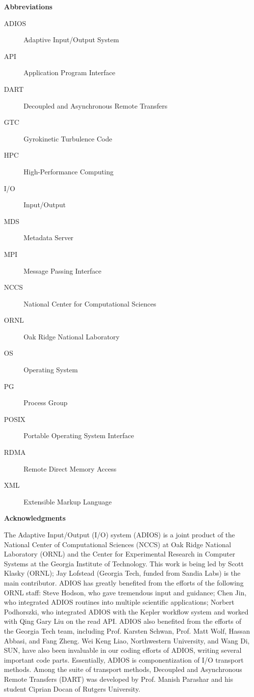 \vspace{66pt}
\textbf{Abbreviations}

\begin{description}
\item[ADIOS]  Adaptive Input/Output System
\item[API] Application Program Interface
\item[DART] Decoupled and Asynchronous Remote Transfers
\item[GTC] Gyrokinetic Turbulence Code
\item[HPC] High-Performance Computing
\item[I/O] Input/Output
\item[MDS] Metadata Server
\item[MPI] Message Passing Interface
\item[NCCS] National Center for Computational Sciences
\item[ORNL] Oak Ridge National Laboratory
\item[OS] Operating System
\item[PG] Process Group
\item[POSIX] Portable Operating System Interface
\item[RDMA] Remote Direct Memory Access
\item[XML] Extensible Markup Language
\end{description}


\vspace{18pt}
\begin{center}
{\large \textbf{Acknowledgments}}
\end{center}

\vspace{6pt}
The Adaptive Input/Output (I/O) system (ADIOS) is a joint product of the National 
Center of Computational Sciences (NCCS) at Oak Ridge National Laboratory (ORNL) 
and the Center for Experimental Research in Computer Systems at the Georgia Institute 
of Technology. This work is being led by Scott Klasky (ORNL); Jay Lofstead (Georgia 
Tech, funded from Sandia Labs) is the main contributor. ADIOS has greatly benefited 
from the efforts of the following ORNL staff: Steve Hodson, who gave tremendous 
input and guidance; Chen Jin, who integrated ADIOS routines into multiple scientific 
applications; Norbert Podhorszki, who integrated ADIOS with the Kepler workflow 
system and worked with Qing Gary Liu on the read API. ADIOS also benefited from 
the efforts of the Georgia Tech team, including Prof. Karsten Schwan, Prof. Matt 
Wolf, Hassan Abbasi, and Fang Zheng. Wei Keng Liao, Northwestern University, and 
Wang Di, SUN, have also been invaluable in our coding efforts of ADIOS, writing 
several important code parts. Essentially, ADIOS is componentization of I/O transport 
methods. Among the suite of transport methods, {\color{color01} Decoupled and Asynchronous 
Remote Transfers (}DART) was developed by Prof. Manish Parashar and his student 
Ciprian Docan of Rutgers University.

